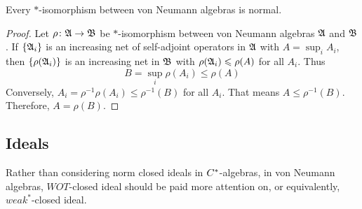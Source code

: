 \begin{prop}
	Every $*$-isomorphism between von Neumann algebras is normal.
\end{prop}
\begin{proof}
	Let $\rho \colon \mathfrak{A} \rightarrow \mathfrak{B}$ be $*$-isomorphism between von Neumann algebras $\mathfrak{A}$ and $\mathfrak{B}$. If $\{\mathfrak{A}_i\}$ is an increasing net of self-adjoint operators in $\mathfrak{A}$ with $A = \sup_i A_i$, then $\{\rho(\mathfrak{A}_i)\}$ is an increasing net in $\mathfrak{B}$ with $\rho(\mathfrak{A}_i) \leqslant \rho(A)$ for all $A_i$. Thus 
	\begin{equation*}
		B = \sup_i  \rho(A_i) \leqslant \rho(A)
	\end{equation*}
	Conversely, $A_i = \rho^{-1}\rho(A_i)  \leqslant \rho^{-1}(B)$ for all $A_i$. That means $A \leqslant \rho^{-1}(B)$. Therefore, $A =  \rho(B)$.
\end{proof}

\subsection{Ideals}

Rather than considering norm closed ideals in $C^{*}$-algebras, in von Neumann algebras, $WOT$-closed ideal should be paid more attention on, or equivalently, $weak^*$-closed ideal.

